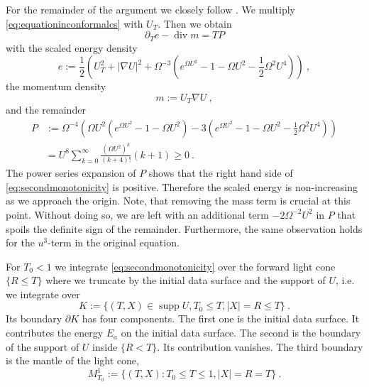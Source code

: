 \documentclass[a4paper]{amsart}
\providecommand{\abs}[1]{\lvert #1 \rvert}
\begin{document}
For the remainder of the argument we closely follow \cite{Struwe10}.
We multiply \eqref{eq:equationinconformalcs} with $U_T$. Then we
obtain
\begin{equation}
  {\partial}_T e - \operatorname{div} m 
  =
  T P
  \label{eq:secondmonotonicity}
\end{equation}
with the scaled energy density
\begin{equation*}
  e
  :=
  \frac{1}{2}
  \left(
  U_T^2
  +
  \abs{\nabla U}^2
  +
  \Omega^{-3}
  (
  e^{\Omega U^2}
  -
  1
  -
  \Omega U^2
  -
  \frac{1}{2} \Omega^2 U^4
  )
  \right) \ ,
\end{equation*}
the momentum density
\begin{equation*}
  m := U_T \nabla U \ ,
\end{equation*}
and the remainder
\begin{equation*}
  \begin{split}
    P
    &:=
    \Omega^{-4}
    \left(
    \Omega U^2
    (e^{\Omega U^2} - 1 - \Omega U^2)
    -
    3 (e^{\Omega U^2} - 1 - \Omega U^2 - \frac{1}{2} \Omega^2 U^4)
    \right) \\
    &=
    U^8 \sum_{k=0}^\infty \frac{(\Omega U^2)^k}{(k + 4)!} (k + 1)
    \geq
    0
    \ .
  \end{split}
\end{equation*}
The power series expansion of $P$ shows that the right hand side of
\eqref{eq:secondmonotonicity} is positive. Therefore the scaled energy is
non-increasing as we approach the origin.
Note, that removing the mass term is crucial at this point. Without
doing so, we are left with an additional term $-2 \Omega^{-2} U^2$ in
$P$ that spoils the definite sign of the remainder. Furthermore, the
same observation holds for the $u^3$-term in the original equation.
\par
For $T_0 < 1$ we integrate
\eqref{eq:secondmonotonicity} over the forward light cone $\{R \leq T\}$ where
we truncate by the initial data surface and the support of $U$, i.e. we
integrate over
\begin{equation*}
  K
  :=
  \{ (T,X) \in \operatorname{supp} U, T_0 \leq T, \abs{X} = R \leq T \} \ .
\end{equation*}
Its boundary $\partial K$ has four components. The first one is the initial
data surface. It contributes the energy $E_a$ on the initial data
surface.
The second is the boundary of the support of $U$ inside $\{R < T\}$. Its
contribution vanishes. The third boundary is the mantle of the light
cone,
\begin{equation*}
  M_{T_0}^1
  :=
  \{ (T,X): T_0 \leq T \leq 1, \abs{X} = R = T \} \ .
\end{equation*}
\end{document}
